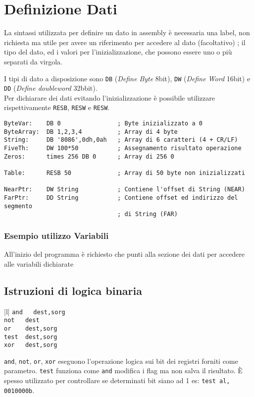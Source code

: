 \documentclass[../template]{subfiles}
\begin{document}
\section{Definizione Dati}
La sintassi utilizzata per definire un dato in assembly è
necessaria una label, non richiesta ma utile per avere un riferimento per accedere al dato (facoltativo) ;
il tipo del dato, ed i valori per l'inizializzazione, che possono essere uno o più separati da virgola.

I tipi di dato a disposizione sono \lstinline{DB} (\textit{Define Byte} 8bit), \lstinline{DW} (\textit{Define Word} 16bit) e \lstinline{DD} (\textit{Define doubleword} 32bbit).
\\
Per dichiarare dei dati evitando l'inizializzazione è possibile utilizzare rispettivamente \lstinline{RESB}, \lstinline{RESW} e \lstinline{RESW}.

\begin{lstlisting}
ByteVar:    DB 0                ; Byte inizializzato a 0
ByteArray:  DB 1,2,3,4          ; Array di 4 byte
String:     DB '8086',0dh,0ah   ; Array di 6 caratteri (4 + CR/LF)
FiveTh:     DW 100*50           ; Assegnamento risultato operazione
Zeros:      times 256 DB 0      ; Array di 256 0

Table:      RESB 50             ; Array di 50 byte non inizializzati

NearPtr:    DW String           ; Contiene l'offset di String (NEAR)
FarPtr:     DD String           ; Contiene offset ed indirizzo del segmento
                                ; di String (FAR)
\end{lstlisting}

\subsubsection{Esempio utilizzo Variabili}

All'inizio del programma è richiesto che \ds punti alla sezione dei dati per accedere alle variabili dichiarate
\subsection{Istruzioni di logica binaria}
\begin{table}[h]
    \centering
    \begin{tabu}{|l|}
        \hline
        \lstinline{and   dest,sorg}  \\
        \lstinline{not   dest}   \\
        \lstinline{or    dest,sorg}   \\
        \lstinline{test  dest,sorg}   \\
        \lstinline{xor   dest,sorg}   \\
        \hline
    \end{tabu}
\end{table}
\lstinline{and}, \lstinline{not}, \lstinline{or}, \lstinline{xor} eseguono l'operazione logica sui bit dei registri forniti come parametro.
\lstinline{test} funziona come \lstinline{and} modifica i flag ma non salva il risultato. È spesso utilizzato per controllare se determinati bit siano ad 1 es: \lstinline{test al, 0010000b}.
\end{document}
